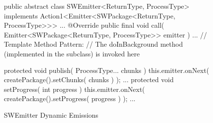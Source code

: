 \begin{figure}[H]
\begin{sourcecode}
\begin{javacode}{}
public abstract class SWEmitter<ReturnType, ProcessType> 
	implements Action1<Emitter<SWPackage<ReturnType, ProcessType>>>
	...
	@Override
	public final void call( Emitter<SWPackage<ReturnType, ProcessType>> emitter ) {
		... 
		// Template Method Pattern:
		// The doInBackground method (implemented in the subclass) is invoked here
	}
	
	protected void publish( ProcessType... chunks ) {
		this.emitter.onNext( createPackage().setChunks( chunks ) );
	}
	...
	protected void setProgress( int progress ) {
		this.emitter.onNext( createPackage().setProgress( progress ) );
	}
	...
\end{javacode}
\caption{SWEmitter Dynamic Emissions}
\label{code:swemitter-dynamic-emissions}
\end{sourcecode}
\end{figure}